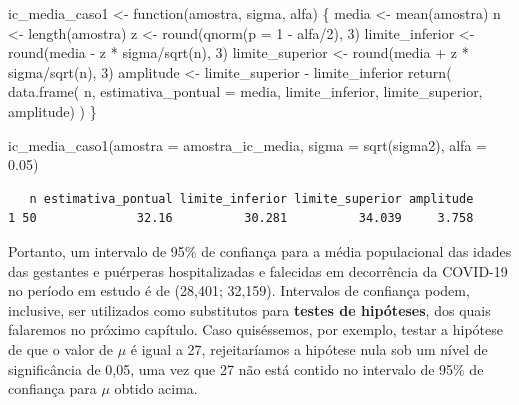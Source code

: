 \documentclass[
  letterpaper,
  DIV=11,
  numbers=noendperiod]{scrreprt}
\newenvironment{Shaded}{\begin{snugshade}}{\end{snugshade}}
\newcommand{\AttributeTok}[1]{\textcolor[rgb]{0.40,0.45,0.13}{#1}}
\newcommand{\ControlFlowTok}[1]{\textcolor[rgb]{0.00,0.23,0.31}{#1}}
\newcommand{\DecValTok}[1]{\textcolor[rgb]{0.68,0.00,0.00}{#1}}
\newcommand{\FloatTok}[1]{\textcolor[rgb]{0.68,0.00,0.00}{#1}}
\newcommand{\FunctionTok}[1]{\textcolor[rgb]{0.28,0.35,0.67}{#1}}
\newcommand{\NormalTok}[1]{\textcolor[rgb]{0.00,0.23,0.31}{#1}}
\newcommand{\OtherTok}[1]{\textcolor[rgb]{0.00,0.23,0.31}{#1}}
\newcommand{\SpecialCharTok}[1]{\textcolor[rgb]{0.37,0.37,0.37}{#1}}
\begin{document}
\begin{Shaded}
\begin{Highlighting}[]
\NormalTok{ic\_media\_caso1 }\OtherTok{\textless{}{-}} \ControlFlowTok{function}\NormalTok{(amostra, sigma, alfa) \{}
\NormalTok{  media }\OtherTok{\textless{}{-}} \FunctionTok{mean}\NormalTok{(amostra)}
\NormalTok{  n }\OtherTok{\textless{}{-}} \FunctionTok{length}\NormalTok{(amostra)}
\NormalTok{  z }\OtherTok{\textless{}{-}} \FunctionTok{round}\NormalTok{(}\FunctionTok{qnorm}\NormalTok{(}\AttributeTok{p =} \DecValTok{1} \SpecialCharTok{{-}}\NormalTok{ alfa}\SpecialCharTok{/}\DecValTok{2}\NormalTok{), }\DecValTok{3}\NormalTok{)}
\NormalTok{  limite\_inferior }\OtherTok{\textless{}{-}} \FunctionTok{round}\NormalTok{(media }\SpecialCharTok{{-}}\NormalTok{ z }\SpecialCharTok{*}\NormalTok{ sigma}\SpecialCharTok{/}\FunctionTok{sqrt}\NormalTok{(n), }\DecValTok{3}\NormalTok{)}
\NormalTok{  limite\_superior }\OtherTok{\textless{}{-}} \FunctionTok{round}\NormalTok{(media }\SpecialCharTok{+}\NormalTok{ z }\SpecialCharTok{*}\NormalTok{ sigma}\SpecialCharTok{/}\FunctionTok{sqrt}\NormalTok{(n), }\DecValTok{3}\NormalTok{)}
\NormalTok{  amplitude }\OtherTok{\textless{}{-}}\NormalTok{ limite\_superior }\SpecialCharTok{{-}}\NormalTok{ limite\_inferior}
  \FunctionTok{return}\NormalTok{(}
    \FunctionTok{data.frame}\NormalTok{(}
\NormalTok{      n, }
      \AttributeTok{estimativa\_pontual =}\NormalTok{ media,}
\NormalTok{      limite\_inferior, }
\NormalTok{      limite\_superior,}
\NormalTok{      amplitude)}
\NormalTok{    )}
\NormalTok{\}}

\FunctionTok{ic\_media\_caso1}\NormalTok{(}\AttributeTok{amostra =}\NormalTok{ amostra\_ic\_media, }\AttributeTok{sigma =} \FunctionTok{sqrt}\NormalTok{(sigma2), }\AttributeTok{alfa =} \FloatTok{0.05}\NormalTok{)}
\end{Highlighting}
\end{Shaded}

\begin{verbatim}
   n estimativa_pontual limite_inferior limite_superior amplitude
1 50              32.16          30.281          34.039     3.758
\end{verbatim}

Portanto, um intervalo de 95\% de confiança para a média populacional
das idades das gestantes e puérperas hospitalizadas e falecidas em
decorrência da COVID-19 no período em estudo é de (28,401; 32,159).
Intervalos de confiança podem, inclusive, ser utilizados como
substitutos para \textbf{testes de hipóteses}, dos quais falaremos no
próximo capítulo. Caso quiséssemos, por exemplo, testar a hipótese de
que o valor de \(\mu\) é igual a 27, rejeitaríamos a hipótese nula sob
um nível de significância de 0,05, uma vez que 27 não está contido no
intervalo de 95\% de confiança para \(\mu\) obtido acima.
\end{document}

